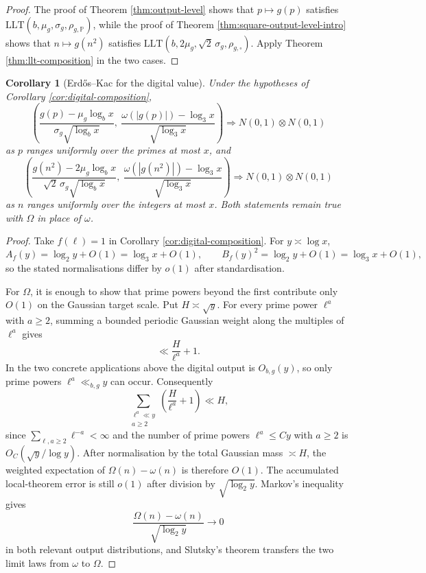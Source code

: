 \documentclass[11pt,reqno]{amsart}
\theoremstyle{plain}
\newtheorem{corollary}[theorem]{Corollary}
\theoremstyle{definition}
\newcommand{\Pp}{\mathbb{P}}
\newcommand{\1}{\mathbf 1}
\begin{document}
\begin{proof}
The proof of Theorem \ref{thm:output-level} shows that $p\mapsto g(p)$ satisfies
$\mathrm{LLT}(b,\mu_g,\sigma_g,\rho_{g,\Pp})$,
while the proof of Theorem \ref{thm:square-output-level-intro} shows that $n\mapsto g(n^2)$ satisfies
$\mathrm{LLT}(b,2\mu_g,\sqrt2\,\sigma_g,\rho_{g,\square})$.
Apply Theorem \ref{thm:llt-composition} in the two cases.
\end{proof}

\begin{corollary}[Erd\H{o}s--Kac for the digital value]\label{cor:omega-ek}
Under the hypotheses of Corollary \ref{cor:digital-composition},
\[
 \left(
 \frac{g(p)-\mu_g\log_bx}{\sigma_g\sqrt{\log_bx}},\
 \frac{\omega(|g(p)|)-\log_3x}{\sqrt{\log_3x}}
 \right)
 \Longrightarrow N(0,1)\otimes N(0,1)
\]
as $p$ ranges uniformly over the primes at most $x$, and
\[
 \left(
 \frac{g(n^2)-2\mu_g\log_bx}{\sqrt2\,\sigma_g\sqrt{\log_bx}},\
 \frac{\omega(|g(n^2)|)-\log_3x}{\sqrt{\log_3x}}
 \right)
 \Longrightarrow N(0,1)\otimes N(0,1)
\]
as $n$ ranges uniformly over the integers at most $x$.  Both statements remain true with $\Omega$ in place of $\omega$.
\end{corollary}

\begin{proof}
Take $f(\ell)=1$ in Corollary \ref{cor:digital-composition}.  For $y\asymp\log x$,
\[
 A_f(y)=\log_2y+O(1)=\log_3x+O(1),
 \qquad
 B_f(y)^2=\log_2y+O(1)=\log_3x+O(1),
\]
so the stated normalisations differ by $o(1)$ after standardisation.

For $\Omega$, it is enough to show that prime powers beyond the first contribute only $O(1)$ on the Gaussian target scale.  Put $H\asymp\sqrt y$.  For every prime power $\ell^a$ with $a\ge2$, summing a bounded periodic Gaussian weight along the multiples of $\ell^a$ gives
\[
 \ll \frac{H}{\ell^a}+1.
\]
In the two concrete applications above the digital output is $O_{b,g}(y)$, so only prime powers $\ell^a\ll_{b,g}y$ can occur.  Consequently
\[
 \sum_{\substack{\ell^a\ll y\\a\ge2}}
 \left(\frac{H}{\ell^a}+1\right)
 \ll H,
\]
since $\sum_{\ell,a\ge2}\ell^{-a}<\infty$ and the number of prime powers $\ell^a\le Cy$ with $a\ge2$ is $O_C(\sqrt y/\log y)$.  After normalisation by the total Gaussian mass $\asymp H$, the weighted expectation of $\Omega(n)-\omega(n)$ is therefore $O(1)$.  The accumulated local-theorem error is still $o(1)$ after division by $\sqrt{\log_2y}$.  Markov's inequality gives
\[
 \frac{\Omega(n)-\omega(n)}{\sqrt{\log_2y}}\longrightarrow0
\]
in both relevant output distributions, and Slutsky's theorem transfers the two limit laws from $\omega$ to $\Omega$.
\end{proof}
\end{document}
